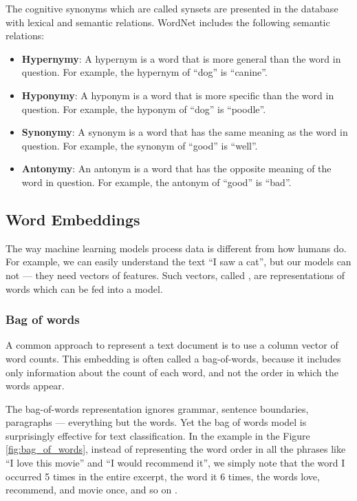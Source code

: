 The cognitive synonyms which are called synsets are presented in the database with lexical and semantic relations. 
WordNet includes the following semantic relations:
\begin{itemize}
    \item \textbf{Hypernymy}: A hypernym is a word that is more general than the word in question. For example, the hypernym of “dog” is “canine”.
    \item \textbf{Hyponymy}: A hyponym is a word that is more specific than the word in question. For example, the hyponym of “dog” is “poodle”.
    \item \textbf{Synonymy}: A synonym is a word that has the same meaning as the word in question. For example, the synonym of “good” is “well”.
    \item \textbf{Antonymy}: An antonym is a word that has the opposite meaning of the word in question. For example, the antonym of “good” is “bad”.
\end{itemize}


\subsection{Word Embeddings}\label{subsec:word-embeddings}
The way machine learning models process data is different from how humans do. 
For example, we can easily understand the text “I saw a cat”, but our models can not --- they need vectors of features. 
Such vectors, called , are representations of words which can be fed into a model.


\subsubsection{Bag of words}\label{subsubsec:bag-of-words}
A common approach to represent a text document is to use a column vector of word counts.
This embedding is often called a \gls{bag-of-words}, because it includes only information about the count of each word, and not the order in which the words appear.

The bag-of-words representation ignores grammar, sentence boundaries, paragraphs — everything but the words. Yet the bag of words model is surprisingly effective for text classification.
In the example in the Figure \ref{fig:bag_of_words}, instead of representing the word order in all the phrases like “I love this movie” and “I would recommend it”, we simply note that the word I occurred 5 times in the entire excerpt, the word it 6 times, the words love, recommend, and movie once, and so on \cite{Jurafsky2009}.

